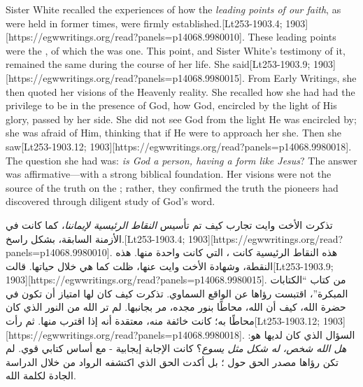 {Sister White recalled the experiences of how the \textit{leading points of our faith}, as were held in former times, were firmly established.[Lt253-1903.4; 1903][https://egwwritings.org/read?panels=p14068.9980010]. These leading points were the , of which the  was one. This point, and Sister White’s testimony of it, remained the same during the course of her life.  She said[Lt253-1903.9; 1903][https://egwwritings.org/read?panels=p14068.9980015]. From Early Writings, she then quoted her visions of the Heavenly reality. She recalled how she had had the privilege to be in the presence of God, how God, encircled by the light of His glory, passed by her side. She did not see God from the light He was encircled by; she was afraid of Him, thinking that if He were to approach her she. Then she saw[Lt253-1903.12; 1903][https://egwwritings.org/read?panels=p14068.9980018]. The question she had was: \textit{is God a person, having a form like Jesus}? The answer was affirmative—with a strong biblical foundation. Her visions were not the source of the truth on the ; rather, they confirmed the truth the pioneers had discovered through diligent study of God’s word.


تذكرت الأخت وايت تجارب كيف تم تأسيس \textit{النقاط الرئيسية لإيماننا}، كما كانت في الأزمنة السابقة، بشكل راسخ.[Lt253-1903.4; 1903][https://egwwritings.org/read?panels=p14068.9980010]. هذه النقاط الرئيسية كانت ، التي كانت  واحدة منها. هذه النقطة، وشهادة الأخت وايت عنها، ظلت كما هي خلال حياتها. قالت[Lt253-1903.9; 1903][https://egwwritings.org/read?panels=p14068.9980015]. من كتاب “الكتابات المبكرة”، اقتبست رؤاها عن الواقع السماوي. تذكرت كيف كان لها امتياز أن تكون في حضرة الله، كيف أن الله، محاطًا بنور مجده، مر بجانبها. لم تر الله من النور الذي كان محاطًا به؛ كانت خائفة منه، معتقدة أنه إذا اقترب منها. ثم رأت[Lt253-1903.12; 1903][https://egwwritings.org/read?panels=p14068.9980018]. السؤال الذي كان لديها هو: \textit{هل الله شخص، له شكل مثل يسوع}؟ كانت الإجابة إيجابية - مع أساس كتابي قوي. لم تكن رؤاها مصدر الحق حول ؛ بل أكدت الحق الذي اكتشفه الرواد من خلال الدراسة الجادة لكلمة الله.


}
